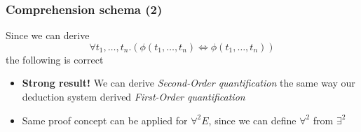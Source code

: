 \documentclass{beamer}
\newenvironment{proofidea}{
    \renewcommand{\proofname}{Proof idea.}\proof
}{\endproof}
\begin{document}
                \begin{frame}
                    \frametitle{Comprehension schema (2)}
                    \begin{proofidea}
                        Since we can derive
                        \[
                            \forall t_1, \dots, t_n.(\phi(t_1, \dots, t_n) \Leftrightarrow \phi(t_1, \dots, t_n))    
                        \]
                        the following is correct
                        \begin{prooftree}
                        \end{prooftree}
                    \end{proofidea}
                    \begin{itemize}
                        \item \textbf{Strong result!} We can derive \textit{Second-Order quantification} the same way our deduction system derived \textit{First-Order quantification}
                        \item Same proof concept can be applied for $ \forall^2E $, since we can define $ \forall^2 $ from $ \exists^2 $ 
                    \end{itemize}
                \end{frame}
\end{document}
